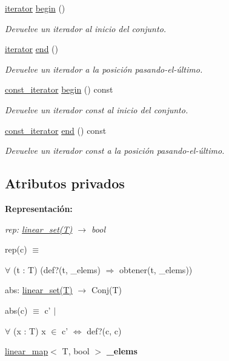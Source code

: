 \begin{DoxyCompactItemize}
\hyperlink{classlinear__set_1_1iterator}{iterator} \hyperlink{classlinear__set_a80bad302b65a43aba2a0fbf5e4637a59}{begin} ()
\begin{DoxyCompactList}\small\item\em Devuelve un iterador al inicio del conjunto. \end{DoxyCompactList}\item 
\hyperlink{classlinear__set_1_1iterator}{iterator} \hyperlink{classlinear__set_aa16e2607ba7bc80c86eda9f2301d194d}{end} ()
\begin{DoxyCompactList}\small\item\em Devuelve un iterador a la posición pasando-\/el-\/último. \end{DoxyCompactList}\item 
\hyperlink{classlinear__set_1_1const__iterator}{const\-\_\-iterator} \hyperlink{classlinear__set_a618bae1c12e9bb0aa0f4f878dbafbdb5}{begin} () const 
\begin{DoxyCompactList}\small\item\em Devuelve un iterador const al inicio del conjunto. \end{DoxyCompactList}\item 
\hyperlink{classlinear__set_1_1const__iterator}{const\-\_\-iterator} \hyperlink{classlinear__set_a9cbffd97e4a2d8d89afdf81fab83dbaa}{end} () const 
\begin{DoxyCompactList}\small\item\em Devuelve un iterador const a la posición pasando-\/el-\/último. \end{DoxyCompactList}\end{DoxyCompactItemize}
\subsection*{Atributos privados}
\begin{Indent}{\bf Representación\-:}\par
{\em rep\-: \hyperlink{classlinear__set}{linear\-\_\-set(\-T)} $\to$ bool\par
rep(c) $\equiv$
\begin{DoxyItemize}
\item $\forall$ (t \-: T) (def?(t, \-\_\-elems) $\Rightarrow$ obtener(t, \-\_\-elems))
\end{DoxyItemize}

abs\-: \hyperlink{classlinear__set}{linear\-\_\-set(\-T)} $\to$ Conj(\-T)\par
abs(c) $\equiv$ c' $|$
\begin{DoxyItemize}
\item $\forall$ (x \-: T) x $\in$ c' $\Leftrightarrow$ def?(c, c) 
\end{DoxyItemize}}\begin{DoxyCompactItemize}
\item 
\hypertarget{classlinear__set_ab9ee1d2a9a2b2786152f68bd0039d201}{\hyperlink{classlinear__map}{linear\-\_\-map}$<$ T, bool $>$ {\bfseries \-\_\-elems}}\label{classlinear__set_ab9ee1d2a9a2b2786152f68bd0039d201}

\end{DoxyCompactItemize}
\end{Indent}


